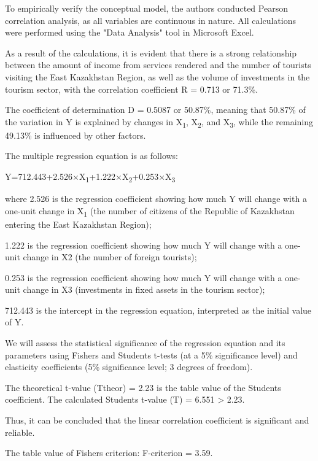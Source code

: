 \begin{multicols}{2}
To empirically verify the conceptual model, the authors conducted
Pearson correlation analysis, as all variables are continuous in nature.
All calculations were performed using the "Data Analysis" tool in
Microsoft Excel.

As a result of the calculations, it is evident that there is a strong
relationship between the amount of income from services rendered and the
number of tourists visiting the East Kazakhstan Region, as well as the
volume of investments in the tourism sector, with the correlation
coefficient R = 0.713 or 71.3\%.

The coefficient of determination D = 0.5087 or 50.87\%, meaning that
50.87\% of the variation in Y is explained by changes in
X\textsubscript{1}, X\textsubscript{2}, and X\textsubscript{3}, while
the remaining 49.13\% is influenced by other factors.

The multiple regression equation is as follows:

Y=712.443+2.526×X\textsubscript{1}+1.222×X\textsubscript{2}+0.253×X\textsubscript{3}

where 2.526 is the regression coefficient showing how much Y will change
with a one-unit change in X\textsubscript{1} (the number of citizens of
the Republic of Kazakhstan entering the East Kazakhstan Region);

1.222 is the regression coefficient showing how much Y will change with
a one-unit change in X2 (the number of foreign tourists);

0.253 is the regression coefficient showing how much Y will change with
a one-unit change in X3 (investments in fixed assets in the tourism
sector);

712.443 is the intercept in the regression equation, interpreted as the
initial value of Y.

We will assess the statistical significance of the regression equation
and its parameters using Fisher\textquotesingle s and
Student\textquotesingle s t-tests (at a 5\% significance level) and
elasticity coefficients (5\% significance level; 3 degrees of freedom).

The theoretical t-value (Ttheor) = 2.23 is the table value of the
Student\textquotesingle s coefficient. The calculated
Student\textquotesingle s t-value (T) = 6.551 \textgreater{} 2.23.

Thus, it can be concluded that the linear correlation coefficient is
significant and reliable.

The table value of Fisher\textquotesingle s criterion: F-criterion =
3.59.


\end{multicols}
